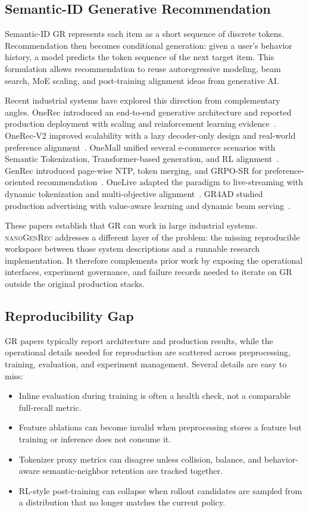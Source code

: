 \documentclass[11pt]{article}
\begin{document}
\subsection{Semantic-ID Generative Recommendation}

Semantic-ID GR represents each item as a short sequence of discrete tokens. Recommendation then becomes conditional generation: given a user's behavior history, a model predicts the token sequence of the next target item. This formulation allows recommendation to reuse autoregressive modeling, beam search, MoE scaling, and post-training alignment ideas from generative AI.

Recent industrial systems have explored this direction from complementary angles. OneRec introduced an end-to-end generative architecture and reported production deployment with scaling and reinforcement learning evidence~\citep{onerec}. OneRec-V2 improved scalability with a lazy decoder-only design and real-world preference alignment~\citep{onerecv2}. OneMall unified several e-commerce scenarios with Semantic Tokenization, Transformer-based generation, and RL alignment~\citep{onemall}. GenRec introduced page-wise NTP, token merging, and GRPO-SR for preference-oriented recommendation~\citep{genrec}. OneLive adapted the paradigm to live-streaming with dynamic tokenization and multi-objective alignment~\citep{onelive}. GR4AD studied production advertising with value-aware learning and dynamic beam serving~\citep{gr4ad}.

These papers establish that GR can work in large industrial systems. \textsc{nanoGenRec} addresses a different layer of the problem: the missing reproducible workspace between those system descriptions and a runnable research implementation. It therefore complements prior work by exposing the operational interfaces, experiment governance, and failure records needed to iterate on GR outside the original production stacks.

\subsection{Reproducibility Gap}

GR papers typically report architecture and production results, while the operational details needed for reproduction are scattered across preprocessing, training, evaluation, and experiment management. Several details are easy to miss:

\begin{itemize}
  \item Inline evaluation during training is often a health check, not a comparable full-recall metric.
  \item Feature ablations can become invalid when preprocessing stores a feature but training or inference does not consume it.
  \item Tokenizer proxy metrics can disagree unless collision, balance, and behavior-aware semantic-neighbor retention are tracked together.
  \item RL-style post-training can collapse when rollout candidates are sampled from a distribution that no longer matches the current policy.
\end{itemize}
\end{document}
